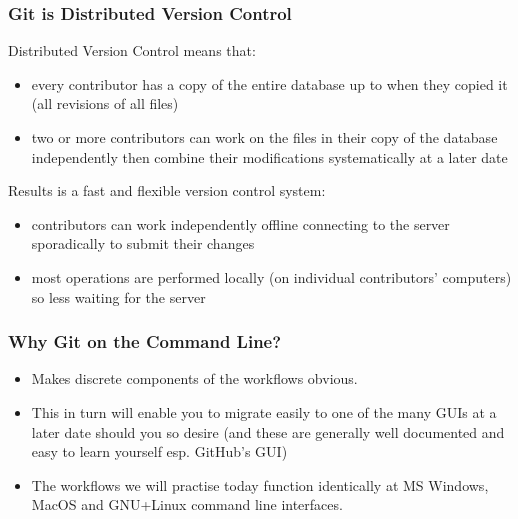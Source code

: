 \documentclass[xcolor=dvipsnames]{beamer}
\begin{document}
\begin{frame} 
\frametitle{Git is Distributed Version Control}
Distributed Version Control means that:
\begin{itemize}
\item every contributor has a copy of the entire database up to when they copied it (all revisions of all files)
\newline
\item two or more contributors can work on the files in their copy of the database independently then combine their modifications systematically at a later date
\newline
\newline
\end{itemize}
Results is a fast and flexible version control system: \begin{itemize}
\item contributors can work independently offline connecting to the server sporadically to submit their changes
\newline
\item most operations are performed locally (on individual contributors' computers) so less waiting for the server
\end{itemize}

\end{frame} 

\begin{frame}
\frametitle{Why Git on the Command Line?}
\begin{itemize}
\item Makes discrete components of the workflows obvious.
\newline
\item This in turn will enable you to migrate easily to one of the many GUIs at a later date should you so desire (and these are generally well documented and easy to learn yourself esp. GitHub's GUI)
\newline
\item The workflows we will practise today function identically at MS Windows, MacOS and GNU+Linux command line interfaces.
\end{itemize}
\end{frame}
\end{document}

